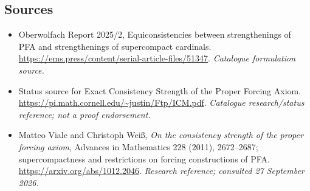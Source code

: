 \documentclass[11pt,a4paper]{article}
\numberwithin{equation}{section}
\begin{document}
\subsection{Sources}
\begin{itemize}\raggedright
\item[\textnormal{[S1]}]\hypertarget{source:193:1}{} Oberwolfach Report 2025/2, Equiconsistencies between strengthenings of PFA and strengthenings of supercompact cardinals.
\url{https://ems.press/content/serial-article-files/51347}.
{\small\textit{Catalogue formulation source.}}
\item[\textnormal{[S2]}]\hypertarget{source:193:2}{} Status source for Exact Consistency Strength of the Proper Forcing Axiom.
\url{https://pi.math.cornell.edu/~justin/Ftp/ICM.pdf}.
{\small\textit{Catalogue research/status reference; not a proof endorsement.}}
\item[\textnormal{[E1]}]\hypertarget{extra:193:1}{} Matteo Viale and Christoph Wei\ss, \emph{On the consistency strength of the proper forcing axiom}, Advances in Mathematics 228 (2011), 2672--2687; supercompactness and restrictions on forcing constructions of PFA.
\url{https://arxiv.org/abs/1012.2046}.
{\small\textit{Research reference; consulted 27 September 2026.}}
\end{itemize}
\end{document}

